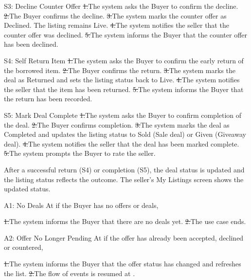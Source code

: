 \begin{flowblock}{S3: Decline Counter Offer}
\st{1.}{The system asks the Buyer to confirm the decline.}
\st{2.}{The Buyer confirms the decline.}
\st{3.}{The system marks the counter offer as Declined. The listing remains Live.}
\st{4.}{The system notifies the seller that the counter offer was declined.}
\st{5.}{The system informs the Buyer that the counter offer has been declined.}
\end{flowblock}
\begin{flowblock}{S4: Self Return Item}
\st{1.}{The system asks the Buyer to confirm the early return of the borrowed item.}
\st{2.}{The Buyer confirms the return.}
\st{3.}{The system marks the deal as Returned and sets the listing status back to Live.}
\st{4.}{The system notifies the seller that the item has been returned.}
\st{5.}{The system informs the Buyer that the return has been recorded.}
\end{flowblock}
\begin{flowblock}{S5: Mark Deal Complete}
\st{1.}{The system asks the Buyer to confirm completion of the deal.}
\st{2.}{The Buyer confirms completion.}
\st{3.}{The system marks the deal as Completed and updates the listing status to Sold (Sale deal) or Given (Giveaway deal).}
\st{4.}{The system notifies the seller that the deal has been marked complete.}
\st{5.}{The system prompts the Buyer to rate the seller.}
\end{flowblock}
After a successful return (S4) or completion (S5), the deal status is updated and the listing status reflects the outcome. The seller's My Listings screen shows the updated status.\par
{}
\begin{flowblock}{A1: No Deals}
At  if the Buyer has no offers or deals,\par
\st{1.}{The system informs the Buyer that there are no deals yet.}
\st{2.}{The use case ends.}
\end{flowblock}
\begin{flowblock}{A2: Offer No Longer Pending}
At  if the offer has already been accepted, declined or countered,\par
\st{1.}{The system informs the Buyer that the offer status has changed and refreshes the list.}
\st{2.}{The flow of events is resumed at .}
\end{flowblock}

